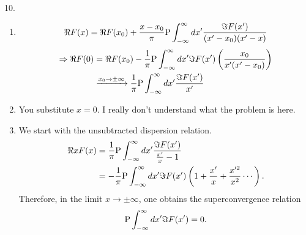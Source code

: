 10.
\begin{enumerate}[wide, labelindent = 0pt, label = (\alph*)]
\item
\[
    \Re F(x)
    = \Re F(x_0)
    + \frac{x - x_0}{\pi} \mathrm{P}\int_{-\infty}^\infty dx' \frac{\Im F(x')}{(x' - x_0)(x' - x)}
\]
\begin{align*}
    \Rightarrow \Re F(0)
    &= \Re F(x_0) - \frac{1}{\pi} \mathrm{P}\int_{-\infty}^\infty dx' \Im F(x') \left(
        \frac{x_0}{x' (x' - x_0)}
    \right) \\
    &\xrightarrow{x_0 \rightarrow \pm \infty}
        \frac{1}{\pi} \mathrm{P}\int_{-\infty}^\infty dx' \frac{\Im F(x')}{x'}
\end{align*}

\item
You substitute $x = 0$.
I really don't understand what the problem is here.

\item
We start with the unsubtracted dispersion relation.
\begin{align*}
    \Re xF(x)
    &= \frac{1}{\pi} \mathrm{P}\int_{-\infty}^\infty dx' \frac{\Im F(x')}{\frac{x'}{x} - 1} \\
    &= -\frac{1}{\pi} \mathrm{P}\int_{-\infty}^\infty dx' \Im F(x') \left( 1 + \frac{x'}{x} + \frac{x'^2}{x^2} \cdots \right).
\end{align*}
Therefore, in the limit $x \rightarrow \pm \infty$, one obtains the superconvergence relation
\[
    \mathrm{P}\int_{-\infty}^\infty dx' \Im F(x') = 0.
\]

\end{enumerate}

